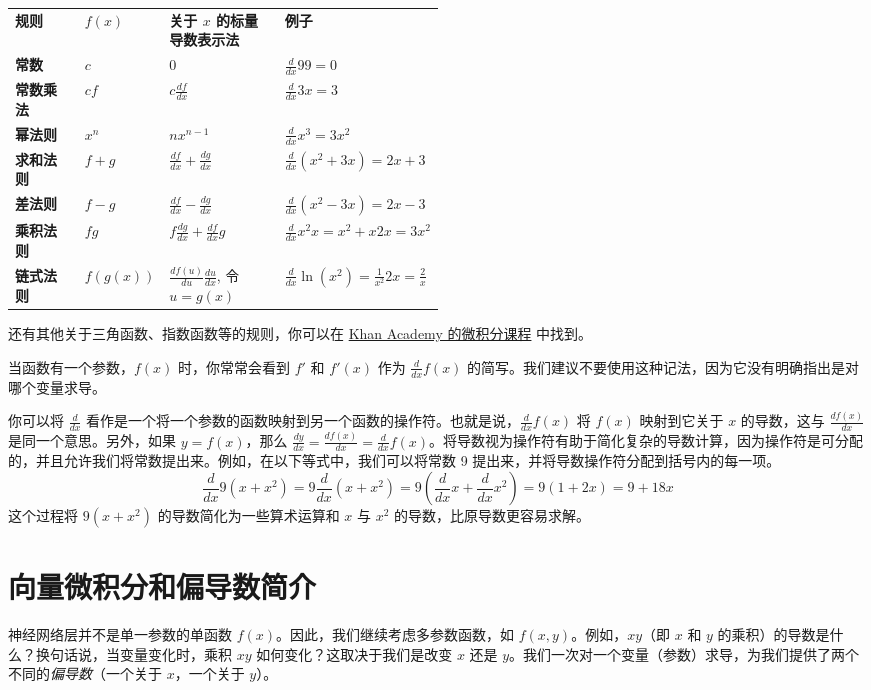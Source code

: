 \documentclass[11pt]{article}
\begin{document}
\begin{tabular}{p{0.20\linewidth}lp{0.30\linewidth}l}
{\bf 规则}&{\bf $f(x)$}&{\bf 关于 $x$ 的标量导数表示法}&{\bf 例子}\\
{\bf 常数}&$c$&$0$&$\frac{d}{dx}99 = 0$\\
{\bf 常数乘法}&$cf$&$c \frac{df}{dx}$&$\frac{d}{dx}3x = 3$\\
{\bf 幂法则}&$x^n$&$nx^{n-1}$&$\frac{d}{dx}x^3 = 3x^2$\\
{\bf 求和法则}&$f + g$&$\frac{df}{dx} + \frac{dg}{dx}$&$\frac{d}{dx} (x^2 + 3x) = 2x + 3$\\
{\bf 差法则}&$f - g$&$\frac{df}{dx} - \frac{dg}{dx}$&$\frac{d}{dx}(x^2 - 3x) = 2x - 3$\\
{\bf 乘积法则}&$fg$&$f \frac{dg}{dx} + \frac{df}{dx} g$&$\frac{d}{dx}x^2x = x^2 + x2x = 3x^2$\\
{\bf 链式法则}&$f(g(x))$&$\frac{df(u)}{du}\frac{du}{dx}$, 令 $u=g(x)$&$\frac{d}{dx} \ln(x^2) = \frac{1}{x^2}2x = \frac{2}{x}$\\
\end{tabular}

还有其他关于三角函数、指数函数等的规则，你可以在 \href{https://www.khanacademy.org/math/differential-calculus}{Khan Academy 的微积分课程} 中找到。

当函数有一个参数，$f(x)$ 时，你常常会看到 $f'$ 和 $f'(x)$ 作为 $\frac{d}{dx}f(x)$ 的简写。我们建议不要使用这种记法，因为它没有明确指出是对哪个变量求导。

你可以将 $\frac{d}{dx}$ 看作是一个将一个参数的函数映射到另一个函数的操作符。也就是说，$\frac{d}{dx} f(x)$ 将 $f(x)$ 映射到它关于 $x$ 的导数，这与 $\frac{df(x)}{dx}$ 是同一个意思。另外，如果 $y = f(x)$，那么 $\frac{dy}{dx} = \frac{df(x)}{dx} = \frac{d}{dx}f(x)$。将导数视为操作符有助于简化复杂的导数计算，因为操作符是可分配的，并且允许我们将常数提出来。例如，在以下等式中，我们可以将常数 9 提出来，并将导数操作符分配到括号内的每一项。
\[
\frac{d}{dx} 9(x + x^2) = 9 \frac{d}{dx}(x + x^2) = 9 (\frac{d}{dx}x + \frac{d}{dx}x^2) = 9(1 + 2x) = 9 + 18x
\]
这个过程将 $9(x + x^2)$ 的导数简化为一些算术运算和 $x$ 与 $x^2$ 的导数，比原导数更容易求解。


\section{向量微积分和偏导数简介}\label{sec3}

神经网络层并不是单一参数的单函数 $f(x)$。因此，我们继续考虑多参数函数，如 $f(x, y)$。例如，$xy$（即 $x$ 和 $y$ 的乘积）的导数是什么？换句话说，当变量变化时，乘积 $xy$ 如何变化？这取决于我们是改变 $x$ 还是 $y$。我们一次对一个变量（参数）求导，为我们提供了两个不同的{\em 偏导数}（一个关于 $x$，一个关于 $y$）。
\end{document}
